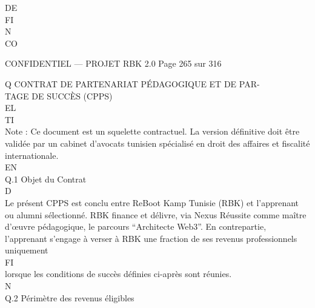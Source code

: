 \documentclass[12pt,landscape,a4paper]{article}
\newenvironment{confidential}
{\begin{tcolorbox}[
    colback=rbkred!5!white,
    colframe=rbkred!75!black,
    title=CONFIDENTIEL,
    fonttitle=\bfseries\color{white},
    coltitle=rbkred!75!black,
    breakable,
    enhanced,
    frame hidden,
    borderline west={2pt}{0pt}{rbkred!75!black}
]}
{\end{tcolorbox}}
\begin{document}
DE\\
FI\\
N\\
CO\\
\vspace{0.5em}
\vspace{0.5em}
\vspace{0.5em}
\vspace{0.5em}
\begin{confidential}CONFIDENTIEL — PROJET RBK 2.0                                   Page 265 sur 316\end{confidential}
Q \textbar{} CONTRAT DE PARTENARIAT PÉDAGOGIQUE ET DE PAR-\\
TAGE DE SUCCÈS (CPPS)\\
\vspace{0.5em}
\vspace{0.5em}
\vspace{0.5em}
\vspace{0.5em}
EL\\
TI\\
Note : Ce document est un squelette contractuel. La version définitive doit être validée par un cabinet d’avocats tunisien spécialisé en droit des affaires et fiscalité internationale.\\
\vspace{0.5em}
\vspace{0.5em}
\vspace{0.5em}
\vspace{0.5em}
EN\\
Q.1 Objet du Contrat\\
\vspace{0.5em}
\vspace{0.5em}
\vspace{0.5em}
\vspace{0.5em}
D\\
Le présent CPPS est conclu entre ReBoot Kamp Tunisie (RBK) et l’apprenant ou alumni sélectionné. RBK finance et délivre, via Nexus Réussite comme maître\\
d’œuvre pédagogique, le parcours “Architecte Web3”. En contrepartie, l’apprenant s’engage à verser à RBK une fraction de ses revenus professionnels uniquement\\
\vspace{0.5em}
\vspace{0.5em}
FI\\
lorsque les conditions de succès définies ci-après sont réunies.\\
N\\
Q.2 Périmètre des revenus éligibles\\
\end{document}
